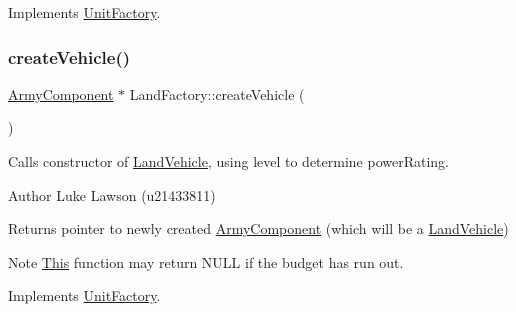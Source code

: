 Implements \mbox{\hyperlink{class_unit_factory_a6f6dda71c85c3f44e09353b63d7c8fb5}{Unit\+Factory}}.

\mbox{\label{class_land_factory_a6f1a99f8b975ca829a188f862060fdcf}} 
\subsubsection{\texorpdfstring{createVehicle()}{createVehicle()}}
{\footnotesize\ttfamily \mbox{\hyperlink{class_army_component}{Army\+Component}} $\ast$ Land\+Factory\+::create\+Vehicle (\begin{DoxyParamCaption}{ }\end{DoxyParamCaption})\hspace{0.3cm}{\ttfamily [virtual]}}



Calls constructor of \mbox{\hyperlink{class_land_vehicle}{Land\+Vehicle}}, using level to determine power\+Rating. 

\begin{DoxyAuthor}{Author}
Luke Lawson (u21433811) 
\end{DoxyAuthor}
\begin{DoxyReturn}{Returns}
pointer to newly created \mbox{\hyperlink{class_army_component}{Army\+Component}} (which will be a \mbox{\hyperlink{class_land_vehicle}{Land\+Vehicle}}) 
\end{DoxyReturn}
\begin{DoxyNote}{Note}
\mbox{\hyperlink{class_this}{This}} function may return N\+U\+LL if the budget has run out. 
\end{DoxyNote}


Implements \mbox{\hyperlink{class_unit_factory_a465dd9ec1883939eb27274164e967822}{Unit\+Factory}}.

